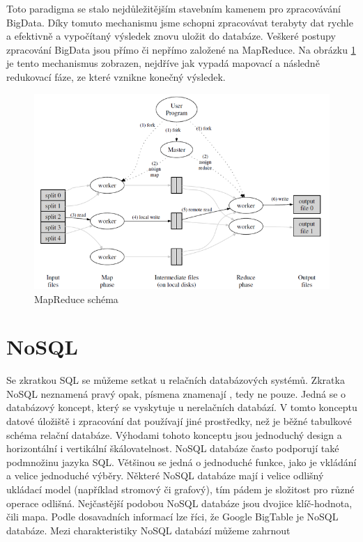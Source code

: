 Toto paradigma se stalo nejdůležitějším stavebním kamenem pro zpracovávání BigData. Díky tomuto mechanismu jsme schopni zpracovávat terabyty dat rychle a efektivně a vypočítaný výsledek znovu uložit do databáze. Veškeré postupy zpracování BigData jsou přímo či nepřímo založené na MapReduce. Na obrázku \ref{fig:mapreduce} je tento mechanismus zobrazen, nejdříve jak vypadá mapovací a následně redukovací fáze, ze které vznikne konečný výsledek.

\begin{figure}[!h]
\includegraphics[scale=0.6]{images/mapreduce}
\caption{MapReduce schéma \cite{mapreduce}}
\label{fig:mapreduce}
\end{figure}

\newpage

\section{NoSQL}
Se zkratkou SQL se můžeme setkat u relačních databázových systémů. Zkratka NoSQL neznamená pravý opak, písmena  znamenají , tedy ne pouze. Jedná se o databázový koncept, který se vyskytuje u nerelačních databází. V tomto konceptu datové úložiště i zpracování dat používají jiné prostředky, než je běžné tabulkové schéma relační databáze. Výhodami tohoto konceptu jsou jednoduchý design a horizontální i vertikální škálovatelnost. NoSQL databáze často podporují také podmnožinu jazyka SQL. Většinou se jedná o jednoduché funkce, jako je vkládání a velice jednoduché výběry. Některé NoSQL databáze mají i velice odlišný ukládací model (například stromový či grafový), tím pádem je složitost pro různé operace odlišná. Nejčastější podobou NoSQL databáze jsou dvojice klíč-hodnota, čili mapa. Podle dosavadních informací lze říci, že Google BigTable je NoSQL databáze. Mezi charakteristiky NoSQL databází můžeme zahrnout

